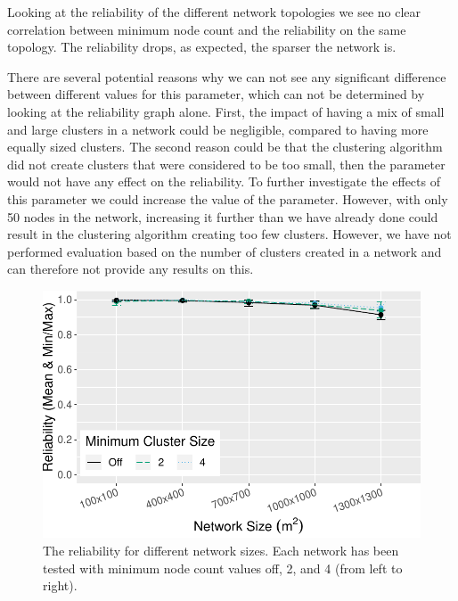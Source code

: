Looking at the reliability of the different network topologies we see no clear correlation between minimum node count and the reliability on the same topology. The reliability drops, as expected, the sparser the network is.

There are several potential reasons why we can not see any significant difference between different values for this parameter, which can not be determined by looking at the reliability graph alone. First, the impact of having a mix of small and large clusters in a network could be negligible, compared to having more equally sized clusters. The second reason could be that the clustering algorithm did not create clusters that were considered to be too small, then the parameter would not have any effect on the reliability. To further investigate the effects of this parameter we could increase the value of the parameter. However, with only 50 nodes in the network, increasing it further than we have already done could result in the clustering algorithm creating too few clusters. However, we have not performed evaluation based on the number of clusters created in a network and can therefore not provide any results on this.



\begin{figure}[bt]
    \centering
    \includegraphics[width=\textwidth, keepaspectratio]{figure/Results/ParameterEvaluation/MinNodeCount_Reliability.pdf}
    \caption{The reliability for different network sizes. Each network has been tested with minimum node count values off, 2, and 4 (from left to right).}
    \label{fig:min-node-count-reliability}
\end{figure}

